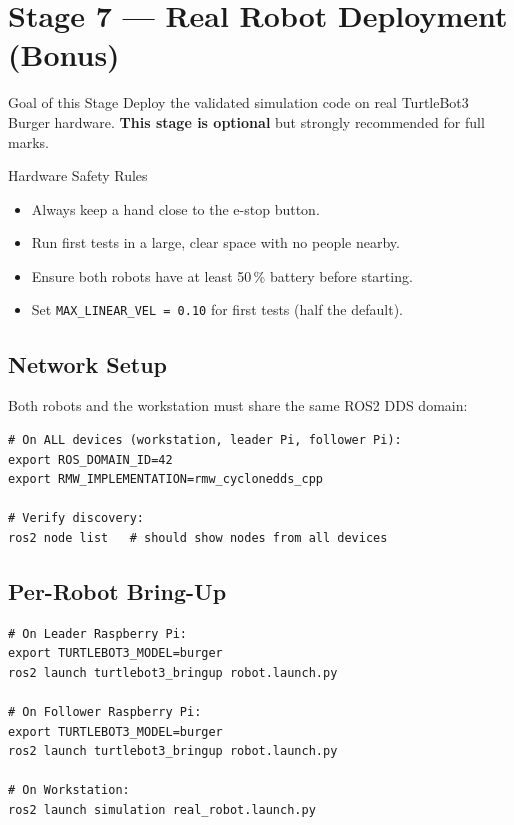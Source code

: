\documentclass[11pt, a4paper]{article}
\begin{document}
\newpage
\section{Stage 7 — Real Robot Deployment (Bonus)}

\begin{infobox}{Goal of this Stage}
Deploy the validated simulation code on real TurtleBot3 Burger hardware.
\textbf{This stage is optional} but strongly recommended for full marks.
\end{infobox}

\begin{warnbox}{Hardware Safety Rules}
\begin{itemize}
  \item Always keep a hand close to the e-stop button.
  \item Run first tests in a large, clear space with no people nearby.
  \item Ensure both robots have at least 50\,\% battery before starting.
  \item Set \texttt{MAX\_LINEAR\_VEL = 0.10} for first tests (half the default).
\end{itemize}
\end{warnbox}

\subsection{Network Setup}

Both robots and the workstation must share the same ROS2 DDS domain:

\begin{lstlisting}[style=shellcode]
# On ALL devices (workstation, leader Pi, follower Pi):
export ROS_DOMAIN_ID=42
export RMW_IMPLEMENTATION=rmw_cyclonedds_cpp

# Verify discovery:
ros2 node list   # should show nodes from all devices
\end{lstlisting}

\subsection{Per-Robot Bring-Up}

\begin{lstlisting}[style=shellcode]
# On Leader Raspberry Pi:
export TURTLEBOT3_MODEL=burger
ros2 launch turtlebot3_bringup robot.launch.py

# On Follower Raspberry Pi:
export TURTLEBOT3_MODEL=burger
ros2 launch turtlebot3_bringup robot.launch.py

# On Workstation:
ros2 launch simulation real_robot.launch.py
\end{lstlisting}
\end{document}
